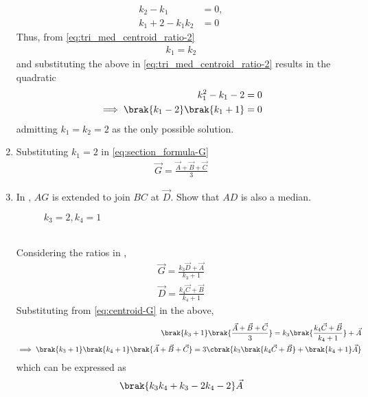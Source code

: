 \begin{enumerate}[label=\thesection.\arabic*.,ref=\thesection.\theenumi]
\begin{align}
\label{eq:tri_med_centroid_ratio-1}
	  k_2-k_1 &= 0,
	  \\
	  k_1 +2 - k_1k_2 &=0
\label{eq:tri_med_centroid_ratio-2}
  \end{align}
  Thus, from 
\eqref{eq:tri_med_centroid_ratio-2}
  \begin{align}
	  k_1=k_2
  \end{align}
  and substituting the above in 
\eqref{eq:tri_med_centroid_ratio-2} results in the quadratic
  \begin{align}
	  k_1^2 - k_1-2 &=0
	  \\
	  \implies 
	  \brak{k_1-2}\brak{k_1+1} &=0
  \end{align}
  admitting $k_1=k_2=2$ as the only possible solution.
  \item Substituting $k_1 =2 $ in 
	  \eqref{eq:section_formula-G}
  \begin{align}
	  \vec{G}=\frac{\vec{A}+\vec{B} + \vec{C}}{3}
	  \label{eq:centroid-G}
  \end{align}
\item 
In	,	
$AG$ is extended to join $BC$ at $\vec{D}$.  Show that $AD$ is also a median.
\begin{figure}[!ht]
	\begin{center}
		\resizebox{\columnwidth}{!}{}
	\end{center}
	\caption{$k_3 = 2, k_4 =1$}
	\label{fig:tri_med_meet}	
\end{figure}
	\\
	\solution Considering the ratios in 
	,	
  \begin{align}
\vec{G} = 
	  \frac{k_3\vec{D}+\vec{A} }{k_3+1} 
	  \\
	\vec{D}  =\frac{k_4\vec{C}+\vec{B} }{k_4+1} 
  \end{align}
  Substituting from 
	  \eqref{eq:centroid-G}
	  in the above, 
  \begin{align}
	  \brak{k_3+1}\brak{\frac{\vec{A}+\vec{B} + \vec{C}}{3}}
 = 
	  {k_3\brak{\frac{k_4\vec{C}+\vec{B} }{k_4+1}} +\vec{A} } 
	  \\
	  \implies \brak{k_3+1}\brak{k_4+1}\brak{{\vec{A}+\vec{B} + \vec{C}}}
 = 
	  {3} \cbrak{ {k_3\brak{{k_4\vec{C}+\vec{B} }} +\brak{k_4+1}\vec{A} }} 
  \end{align}
  which can be expressed as
  \begin{multline}
	  \brak{k_3k_4+k_3-2k_4-2}\vec{A}

\end{multline}
\end{enumerate}
